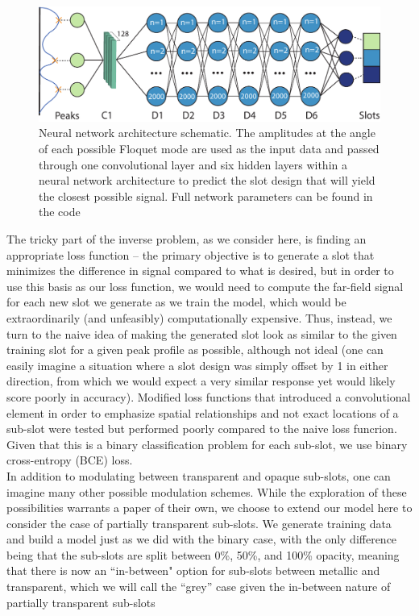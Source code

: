 \documentclass[11pt]{article}
\begin{document}
\begin{figure}[H]
	\centering
	\includegraphics[width=5.2in]{figures/fig1pdf}
	\caption{Neural network architecture schematic. The amplitudes at the angle of each possible Floquet mode are used as the input data and passed through one convolutional layer and six hidden layers within a neural network architecture to predict the  slot design that will yield the closest possible signal. Full network parameters can be found in the code}
\end{figure}

\noindent The tricky part of the inverse problem, as we consider here, is finding an appropriate loss function -- the primary objective is to generate a slot that minimizes the difference in signal compared to what is desired, but in order to use this basis as our loss function, we would need to compute the far-field signal for each new slot we generate as we train the model, which would be extraordinarily (and unfeasibly) computationally expensive. Thus, instead, we turn to the naive idea of making the generated slot look as similar to the given training slot for a given peak profile as possible, although not ideal (one can easily imagine a situation where a slot design was simply offset by 1 in either direction, from which we would expect a very similar response yet would likely score poorly in accuracy). Modified loss functions that introduced a convolutional element in order to emphasize spatial relationships and not exact locations of a sub-slot were tested but performed poorly compared to the naive loss funcrion. Given that this is a binary classification problem for each sub-slot, we use binary cross-entropy (BCE) loss. \cite{10.1145/1102351.1102422} \\

\noindent In addition to modulating between transparent and opaque sub-slots, one can imagine many other possible modulation schemes. While the exploration of these possibilities warrants a paper of their own, we choose to extend our model here to consider the case of partially transparent sub-slots. We generate training data and build a model just as we did with the binary case, with the only difference being that the sub-slots are split between 0\%, 50\%, and 100\% opacity, meaning that there is now an ``in-between" option for sub-slots between metallic and transparent, which we will call the ``grey'' case given the in-between nature of partially transparent sub-slots \\
\end{document}
